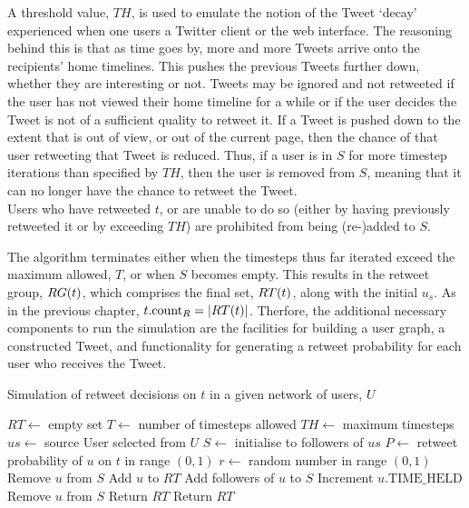 A threshold value, $TH$, is used to emulate the notion of the Tweet `decay' experienced when one users a Twitter client or the web interface. The reasoning behind this is that as time goes by, more and more Tweets arrive onto the recipients' home timelines. This pushes the previous Tweets further down, whether they are interesting or not. Tweets may be ignored and not retweeted if the user has not viewed their home timeline for a while or if the user decides the Tweet is not of a sufficient quality to retweet it. If a Tweet is pushed down to the extent that is out of view, or out of the current page, then the chance of that user retweeting that Tweet is reduced. Thus, if a user is in $S$ for more timestep iterations than specified by $TH$, then the user is removed from $S$, meaning that it can no longer have the chance to retweet the Tweet.\\
Users who have retweeted $t$, or are unable to do so (either by having previously retweeted it or by exceeding $TH$) are prohibited from being (re-)added to $S$.

The algorithm terminates either when the timesteps thus far iterated exceed the maximum allowed, $T$, or when $S$ becomes empty. This results in the retweet group, $RG(t)$, which comprises the final set, $RT(t)$, along with the initial $u_s$. As in the previous chapter, $t.\textrm{count}_R = |RT(t)|$. Therfore, the additional necessary components to run the simulation are the facilities for building a user graph, a constructed Tweet, and functionality for generating a retweet probability for each user who receives the Tweet.

\begin{algorithm}
\caption{Simulation of retweet decisions on $t$ in a given network of users, $U$}
\begin{algorithmic}[1]
    \State $RT\gets$ empty set 
    \State $T\gets$ number of timesteps allowed
    \State $TH\gets$ maximum timesteps 
    \State $us\gets$ source User selected from $U$
    \State $S\gets$ initialise to followers of $us$
    \Statex %
            \State $P\gets$ retweet probability of $u$ on $t$ in range $(0,1)$
            \State $r\gets$ random number in range $(0,1)$
                \State Remove $u$ from $S$
                \State Add $u$ to $RT$
                \State Add followers of $u$ to $S$
            \Else
                \State Increment $u.\textrm{TIME\_HELD}$
                    \State Remove $u$ from $S$ 
                \EndIf
            \EndIf
        \EndFor
            \State Return $RT$ 
        \EndIf
    \EndFor
    \State Return $RT$
\EndProcedure
\end{algorithmic}
\label{algo1}
\end{algorithm}


